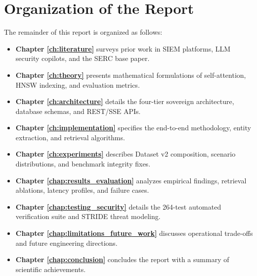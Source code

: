 \section{Organization of the Report}
\label{sec:org}
The remainder of this report is organized as follows:
\begin{itemize}
  \item \textbf{Chapter \ref{ch:literature}} surveys prior work in SIEM platforms, LLM security copilots, and the SERC base paper.
  \item \textbf{Chapter \ref{ch:theory}} presents mathematical formulations of self-attention, HNSW indexing, and evaluation metrics.
  \item \textbf{Chapter \ref{ch:architecture}} details the four-tier sovereign architecture, database schemas, and REST/SSE APIs.
  \item \textbf{Chapter \ref{ch:implementation}} specifies the end-to-end methodology, entity extraction, and retrieval algorithms.
  \item \textbf{Chapter \ref{ch:experiments}} describes Dataset v2 composition, scenario distributions, and benchmark integrity fixes.
  \item \textbf{Chapter \ref{chap:results_evaluation}} analyzes empirical findings, retrieval ablations, latency profiles, and failure cases.
  \item \textbf{Chapter \ref{chap:testing_security}} details the 264-test automated verification suite and STRIDE threat modeling.
  \item \textbf{Chapter \ref{chap:limitations_future_work}} discusses operational trade-offs and future engineering directions.
  \item \textbf{Chapter \ref{chap:conclusion}} concludes the report with a summary of scientific achievements.
\end{itemize}